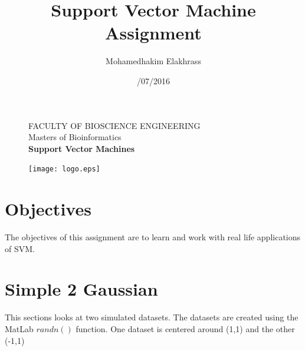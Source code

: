 \documentclass[11pt,oneside,a4paper]{article}
\title{\vspace*{40.0mm}
  \bf\sf Support Vector Machine Assignment 
         \vspace*{20.0mm} \\
  \vspace*{40.0mm}
  }
\author{\sf Mohamedhakim Elakhrass}
\date{\sf 15/07/2016}
\makeatletter
\def\cleardoublepage{\clearpage\if@twoside \ifodd\c@page\else%
\hbox{}%
\thispagestyle{empty}%
\clearpage%
\if@twocolumn\hbox{}\clearpage\fi\fi\fi}
\makeatother
\begin{document}
	
	
\begin{figure}
  \parbox[t]{125mm}{
    \vspace*{6mm}
    \scriptsize\sf           FACULTY OF BIOSCIENCE ENGINEERING\\
    \scriptsize\sf           Masters of Bioinformatics \\
    \scriptsize\sf\bfseries  Support Vector Machines \\}
  \parbox[t]{40mm}{
    \begin{flushright}
      \texttt{[image: logo.eps]}
    \end{flushright}}
\end{figure}

\maketitle
\thispagestyle{empty}
\raggedbottom

\cleardoublepage
{}
\setcounter{tocdepth}{2}
\tableofcontents
\cleardoublepage
{}

\cleardoublepage

\section{Objectives}
The objectives of this assignment are to learn and work with real life applications of SVM. 
\section{Simple 2 Gaussian}
This sections looks at two simulated datasets. The datasets are created using the MatLab $randn()$ function. One dataset is centered around (1,1) and the other (-1,1)\\
\end{document}
